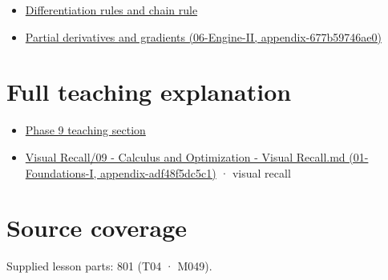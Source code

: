 \begin{itemize}
\tightlist
\item
  \hyperref[appendix-d9f70bdfbc92]{Differentiation rules and chain rule}
\item
  \href{../06-Engine-II/main.pdf\#nameddest=appendix-677b59746ae0}{Partial derivatives and gradients (06-Engine-II, appendix-677b59746ae0)}
\end{itemize}

\section{Full teaching explanation}\label{appendix-a59658325cd6-full-teaching-explanation}

\begin{itemize}
\tightlist
\item
  \href{Continuous\%20Notes/Computing\%20Foundations\%20-\%20From\%20Bits\%20to\%20C++\%20and\%20Systems\%20APIs\#Functions,\%20limits,\%20continuity,\%20and\%20scalar\%20change}{Phase 9 teaching section}
\item
  \href{../01-Foundations-I/main.pdf\#nameddest=appendix-adf48f5dc5c1}{Visual Recall/09 - Calculus and Optimization - Visual Recall.md (01-Foundations-I, appendix-adf48f5dc5c1)} · visual recall
\end{itemize}

\section{Source coverage}\label{appendix-a59658325cd6-source-coverage}

Supplied lesson parts: 801 (T04 · M049).
